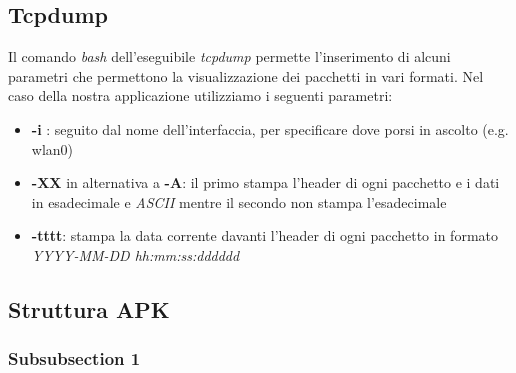 \documentclass[12pt]{article} %
\begin{document}

\subsection{Tcpdump} %

Il comando \textit{bash} dell'eseguibile \textit{tcpdump} permette l'inserimento di alcuni parametri che permettono la visualizzazione dei pacchetti in vari formati. Nel caso della nostra applicazione utilizziamo i seguenti parametri:

\begin{itemize}
\item \textbf{-i} : seguito dal nome dell'interfaccia, per specificare dove porsi in ascolto (e.g. wlan0)
\item \textbf{-XX} in alternativa a \textbf{-A}: il primo stampa l'header di ogni pacchetto e i dati in esadecimale e \textit{ASCII} mentre il secondo non stampa l'esadecimale
\item \textbf{-tttt}: stampa la data corrente davanti l'header di ogni pacchetto in formato \textit{YYYY-MM-DD hh:mm:ss:dddddd}
\end{itemize}



\subsection*{Struttura APK}

\subsubsection{Subsubsection 1} %

\lipsum[6] %







\end{document}
